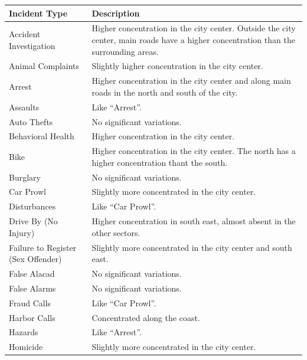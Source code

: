 \renewcommand{\arraystretch}{1.5}
\begin{longtable}{ | >{\arraybackslash} m{3.8cm} | >{\arraybackslash} m{11.2cm} | }
    \hline
    \textbf{Incident Type} & \textbf{Description} \\
    \hline
    Accident Investigation  &   Higher concentration in the city center. Outside the city center, main roads have a higher concentration than the surrounding areas. \\
    \hline        
    Animal Complaints       &   Slightly higher concentration in the city center. \\
    \hline
    Arrest                  &   Higher concentration in the city center and along main roads in the north and south of the city. \\
    \hline
    Assaults                &   Like ``Arrest''. \\
    \hline
    Auto Thefts             &   No significant variations. \\
    \hline
    Behavioral Health       &   Higher concentration in the city center. \\
    \hline
    Bike                    &   Higher concentration in the city center. The north has a higher concentration thant the south. \\
    \hline
    Burglary                &   No significant variations. \\
    \hline
    Car Prowl               &   Slightly more concentrated in the city center. \\
    \hline
    Disturbances            &   Like ``Car Prowl''. \\
    \hline
    Drive By (No Injury)    &   Higher concentration in south east, almost absent in the other sectors. \\
    \hline
    Failure to Register (Sex Offender) &   Slightly more concentrated in the city center and south east. \\
    \hline
    False Alacad            &   No significant variations. \\
    \hline
    False Alarms            &   No significant variations. \\
    \hline
    Fraud Calls             &   Like ``Car Prowl''. \\
    \hline
    Harbor Calls            &   Concentrated along the coast. \\
    \hline
    Hazards                 &   Like ``Arrest''. \\
    \hline
    Homicide                &   Slightly more concentrated in the city center. \\

\end{longtable}
